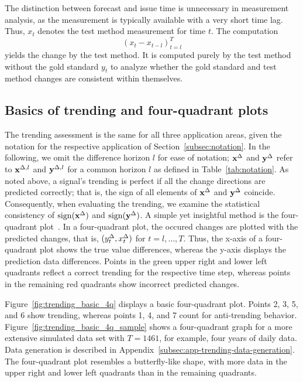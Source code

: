 The distinction between forecast and issue time is unnecessary in measurement analysis, as the measurement is typically available with a very short time lag. 
Thus, $x_t$ denotes the test method measurement for time $t$. 
The computation
\begin{equation}
  (x_{t} - x_{t-l})_{t=l}^T \label{eq:diffxl_measure}
\end{equation}
yields the change by the test method. 
It is computed purely by the test method without the gold standard $y_t$ to analyze whether the gold standard and test method changes are consistent within themselves.

\subsection{Basics of trending and four-quadrant plots}\label{subsec:trending-four-quadrant-plot}

The trending assessment is the same for all three application areas, given the notation for the respective application of Section~\ref{subsec:notation}.
In the following, we omit the difference horizon $l$ for ease of notation; $\mathbf{x}^{\Delta}$ and $\mathbf{y}^{\Delta}$ refer to $\mathbf{x}^{\Delta,l}$ and $\mathbf{y}^{\Delta,l}$ for a common horizon $l$ as defined in Table~\ref{tab:notation}.
As noted above, a signal's trending is perfect if all the change directions are predicted correctly; that is, the sign of all elements of $\mathbf{x}^{\Delta}$ and $\mathbf{y}^{\Delta}$ coincide.
Consequently, when evaluating the trending, we examine the statistical consistency of $\operatorname{sign}(\mathbf{x}^{\Delta})$ and $\operatorname{sign}(\mathbf{y}^{\Delta})$.
A simple yet insightful method is the four-quadrant plot~\parencite[see, e.g., ][]{perrino1998intraoperative,Saugel2015}. 
In a four-quadrant plot, the occured changes are plotted with the predicted changes, that is, $(y^{\Delta}_{t}, x^{\Delta}_{t})$ for $t = l, \dots, T$.
Thus, the x-axis of a four-quadrant plot shows the true value differences, whereas the y-axis displays the prediction data differences.
Points in the green upper right and lower left quadrants reflect a correct trending for the respective time step, whereas points in the remaining red quadrants show incorrect predicted changes.

Figure~\ref{fig:trending_basic_4q} displays a basic four-quadrant plot.
Points 2, 3, 5, and 6 show trending, whereas points 1, 4, and 7 count for anti-trending behavior.
Figure~\ref{fig:trending_basic_4q_sample} shows a four-quadrant graph for a more extensive simulated data set with $T=1461$, for example, four years of daily data.
Data generation is described in Appendix~\ref{subsec:app-trending-data-generation}.
The four-quadrant plot resembles a butterfly-like shape, with more data in the upper right and lower left quadrants than in the remaining quadrants.

